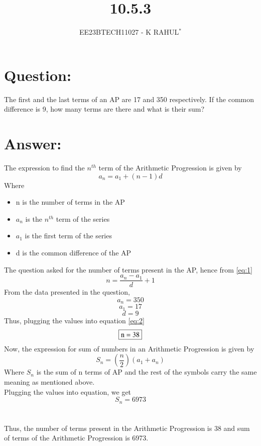 \documentclass[journal,12pt,twocolumn]{IEEEtran}
\theoremstyle{remark}
\begin{document}

\vspace{3cm}
\title{10.5.3}
\author{EE23BTECH11027 - K RAHUL$^{*}$%
}
\maketitle
\newpage
\bigskip
\renewcommand{\thefigure}{\theenumi}
\renewcommand{\thetable}{\theenumi}
\section{Question:}
The first and the last terms of an AP are 17 and 350 respectively. If the common difference
is 9, how many terms are there and what is their sum?
\section{Answer:}
The expression to find the $n^{th}$ term of the Arithmetic Progression is given by
\begin{equation}\label{eq:1}a_n = a_1 + (n-1)d\end{equation}
Where
\begin{itemize}
\item n is the number of terms in the AP
\item $a_n$ is the $n^{th}$ term of the series
\item $a_1$ is the first term of the series
\item d is the common difference of the AP
\end{itemize}
\bigskip
The question asked for the number of terms present in the AP, hence from \ref{eq:1}
\begin{equation}\label{eq:2} n=\frac{a_n-a_1}{d} + 1\end{equation}
From the data presented in the question,
$$ a_n=350 $$
$$ a_1=17 $$
$$ d=9 $$
Thus, plugging the values into equation \ref{eq:2}
$$\fbox{n = 38}$$
Now, the expression for sum of numbers in an Arithmetic Progression is given by
\begin{equation}\label{eq:3} S_n = (\frac{n}{2})(a_1+a_n)\end{equation}
Where $S_n$ is the sum of n terms of AP and the rest of the symbols carry the same meaning as mentioned above.\\
Plugging the values into equation, we get
$$S_n = 6973$$\\\\
Thus, the number of terms present in the Arithmetic Progression is 38 and sum of terms of the Arithmetic Progression is 6973.
\end{document}
